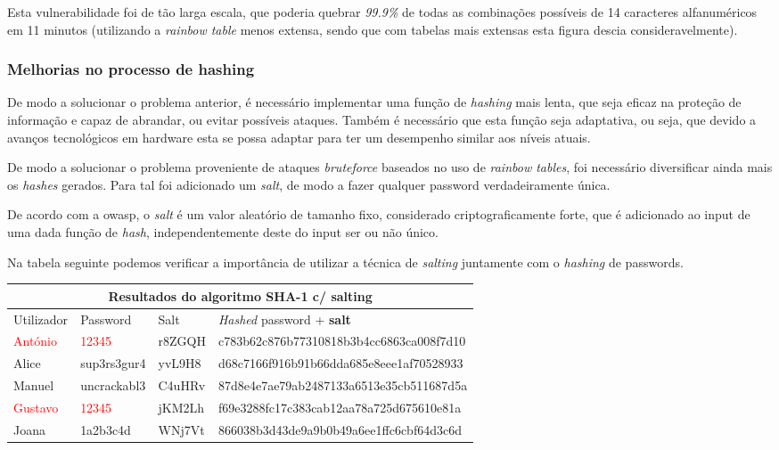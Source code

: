Esta vulnerabilidade foi de tão larga escala, que poderia quebrar \emph{99.9\%} de todas as combinações possíveis de 14 caracteres alfanuméricos em 11 minutos (utilizando a \emph{rainbow table} menos extensa, sendo que com tabelas mais extensas esta figura descia consideravelmente).


\subsubsection{Melhorias no processo de hashing}

De modo a solucionar o problema anterior, é necessário implementar uma função de \emph{hashing} mais lenta, que seja eficaz na proteção de informação e capaz de abrandar, ou evitar possíveis ataques. Também é necessário que esta função seja adaptativa, ou seja, que devido a avanços tecnológicos em hardware esta se possa adaptar para ter um desempenho similar aos níveis atuais.

De modo a solucionar o problema proveniente de ataques \emph{bruteforce} baseados no uso de \emph{rainbow tables}, foi necessário diversificar ainda mais os \emph{hashes} gerados. Para tal foi adicionado um \emph{salt}, de modo a fazer qualquer password verdadeiramente única.

De acordo com a \gls{owasp}, o \emph{salt} é um valor aleatório de tamanho fixo, considerado criptograficamente forte, que é adicionado ao input de uma dada função de \emph{hash}, independentemente deste do input ser ou não único.

Na tabela seguinte podemos verificar a importância de utilizar a técnica de \emph{salting} juntamente com o \emph{hashing} de passwords.

\begin{center}
    \begin{tabular}{ |p{1.7cm}|p{2cm}|p{1.5cm}|p{8cm}|  }
        \hline
        \multicolumn{4}{|c|}{Resultados do algoritmo SHA-1 c/ salting} \\
        \hline
        Utilizador & Password & Salt &\emph{Hashed} password + \textbf{salt}\\
        \hline 
        \textcolor{red}{António} & \textcolor{red}{12345} & r8ZGQH & c783b62c876b77310818b3b4cc6863ca008f7d10\\
        Alice & sup3rs3gur4 & yvL9H8 & d68c7166f916b91b66dda685e8eee1af70528933\\
        Manuel & uncrackabl3 & C4uHRv & 87d8e4e7ae79ab2487133a6513e35cb511687d5a\\
        \textcolor{red}{Gustavo} & \textcolor{red}{12345} & jKM2Lh & f69e3288fc17c383cab12aa78a725d675610e81a\\
        Joana & 1a2b3c4d & WNj7Vt & 866038b3d43de9a9b0b49a6ee1ffc6cbf64d3c6d\\
        \hline
    \end{tabular}
\label{tab:sha1_salt} 
\end{center}

